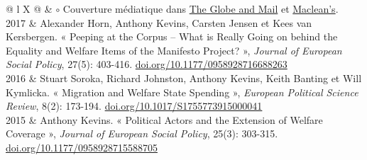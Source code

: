 \documentclass[letterpaper,fontsize=10.5pt]{scrartcl}
\begin{document}
\begin{longtblr}[entry=none,label=none]{@{} l X @{}}
	              & $\circ$ Couverture médiatique dans  \href{https://www.theglobeandmail.com/opinion/big-tent-politics-is-now-all-but-dead/article24944734/}{The Globe and Mail} et \href{https://www.macleans.ca/politics/this-is-whats-wrong-with-canadas-right/}{Maclean's}.                                                                                          \\
	2017          & Alexander Horn, Anthony Kevins, Carsten Jensen et Kees van Kersbergen. « Peeping at the Corpus – What is Really Going on behind the Equality and Welfare Items of the Manifesto Project? », \textit{Journal of European Social Policy}, 27(5): 403-416. \href{https://doi.org/10.1177/0958928716688263}{doi.org/10.1177/0958928716688263} \\ 
	2016          & Stuart Soroka, Richard Johnston, Anthony Kevins, Keith Banting et Will Kymlicka. « Migration and Welfare State Spending », \textit{European Political Science Review}, 8(2): 173-194. \href{https://doi.org/10.1017/S1755773915000041}{doi.org/10.1017/S1755773915000041}                                                                   \\ 
	2015          & Anthony Kevins. « Political Actors and the Extension of Welfare Coverage », \textit{Journal of European Social Policy}, 25(3): 303-315. \href{https://doi.org/10.1177/0958928715588705}{doi.org/10.1177/0958928715588705}                                                                                                                   \\
\end{longtblr}
\end{document}

